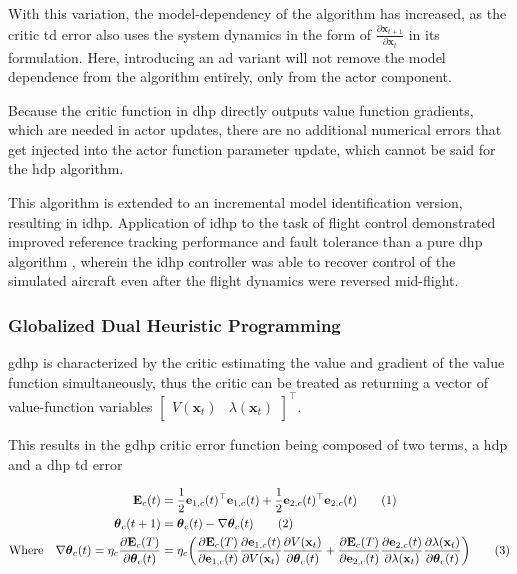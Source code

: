 \documentclass[../report.tex]{subfiles}
\begin{document}
With this variation, the model-dependency of the algorithm has increased, as the critic \ac{td} error also uses the system dynamics in the form of $\frac{\partial \mathbf{x}_{t+1}}{\partial \mathbf{x}_t}$ in its formulation. Here, introducing an \ac{ad} variant will not remove the model dependence from the algorithm entirely, only from the actor component.

Because the critic function in \ac{dhp} directly outputs value function gradients, which are needed in actor updates, there are no additional numerical errors that get injected into the actor function parameter update, which cannot be said for the \ac{hdp} algorithm. 

This algorithm is extended to an incremental model identification version, resulting in \ac{idhp}. Application of \ac{idhp} to the task of flight control demonstrated improved reference tracking performance and fault tolerance than a pure \ac{dhp} algorithm \cite{idhp, heyer_idhp},  wherein the \ac{idhp} controller was able to recover control of the simulated aircraft even after the flight dynamics were reversed mid-flight. 

\subsubsection{Globalized Dual Heuristic Programming}
\ac{gdhp} is characterized by the critic estimating the value and gradient of the value function simultaneously, thus the critic can be treated as returning a vector of value-function variables $\begin{bmatrix}
        V(\mathbf{x}_t) &
        \lambda(\mathbf{x}_t)
    \end{bmatrix} ^{\top}$.

This results in the \ac{gdhp} critic error function being composed of two terms, a \ac{hdp} and a \ac{dhp} td error

\begin{align*}
    \mathbf{E}_c(t) &= \frac{1}{2}\mathbf{e}_{1,c}(t)^{\top}\mathbf{e}_{1,c}(t)   + \frac{1}{2}\mathbf{e}_{2,c}(t)^{\top}\mathbf{e}_{2,c}(t) \stepcounter{equation}\tag{\theequation}\label{eq:gdhp_critic_error_function}\\
    \boldsymbol{\theta}_c(t+1) &= \boldsymbol{\theta}_c(t) - \nabla \boldsymbol{\theta}_c(t) \stepcounter{equation}\tag{\theequation}\label{eq:gdhp_critic_update}\\
    \text{Where} \quad \nabla \boldsymbol{\theta}_c(t) = \eta_c \frac{\partial \mathbf{E}_c(T)}{\partial \boldsymbol{\theta}_c(t)}  &= \eta_c \bigg(\frac{\partial \mathbf{E}_c(T)}{\partial \mathbf{e}_{1,c}(t)} \frac{\partial \mathbf{e}_{1,c}(t)}{\partial V(\mathbf{x}_t)} \frac{\partial V(\mathbf{x}_t)}{\partial \boldsymbol{\theta}_c(t)} + \frac{\partial \mathbf{E}_c(T)}{\partial \mathbf{e}_{2,c}(t)} \frac{\partial \mathbf{e}_{2,c}(t)}{\partial \lambda(\mathbf{x}_t)} \frac{\partial \lambda(\mathbf{x}_t)}{\partial \boldsymbol{\theta}_c(t)}\bigg) \stepcounter{equation}\tag{\theequation}\label{eq:gdhp_critic_weight_chainrule}\\
\end{align*}
\end{document}

